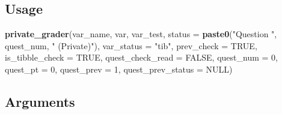 \documentclass[
  12pt,
]{book}
\newenvironment{Shaded}{\begin{snugshade}}{\end{snugshade}}
\newcommand{\AttributeTok}[1]{\textcolor[rgb]{0.13,0.29,0.53}{#1}}
\newcommand{\ConstantTok}[1]{\textcolor[rgb]{0.56,0.35,0.01}{#1}}
\newcommand{\DecValTok}[1]{\textcolor[rgb]{0.00,0.00,0.81}{#1}}
\newcommand{\FunctionTok}[1]{\textcolor[rgb]{0.13,0.29,0.53}{\textbf{#1}}}
\newcommand{\NormalTok}[1]{#1}
\newcommand{\StringTok}[1]{\textcolor[rgb]{0.31,0.60,0.02}{#1}}
\begin{document}
\subsection*{Usage}\label{usage}

\begin{Shaded}
\begin{Highlighting}[]
\FunctionTok{private\_grader}\NormalTok{(var\_name, }
\NormalTok{               var, }
\NormalTok{               var\_test, }
               \AttributeTok{status =} \FunctionTok{paste0}\NormalTok{(}\StringTok{"Question "}\NormalTok{, quest\_num, }\StringTok{" (Private)"}\NormalTok{), }
               \AttributeTok{var\_status =} \StringTok{"tib"}\NormalTok{, }
               \AttributeTok{prev\_check =} \ConstantTok{TRUE}\NormalTok{, }
               \AttributeTok{is\_tibble\_check =} \ConstantTok{TRUE}\NormalTok{, }
               \AttributeTok{quest\_check\_read =} \ConstantTok{FALSE}\NormalTok{, }
               \AttributeTok{quest\_num =} \DecValTok{0}\NormalTok{, }
               \AttributeTok{quest\_pt =} \DecValTok{0}\NormalTok{,}
               \AttributeTok{quest\_prev =} \DecValTok{1}\NormalTok{, }
               \AttributeTok{quest\_prev\_status =} \ConstantTok{NULL}\NormalTok{)}
\end{Highlighting}
\end{Shaded}

\subsection*{Arguments}\label{arguments}

\renewcommand{\arraystretch}{2}
\end{document}
